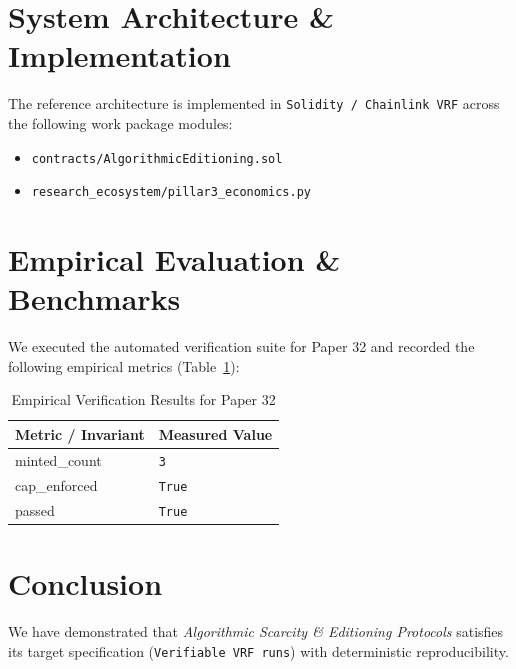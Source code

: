 \documentclass[10pt,twocolumn]{article}
\begin{document}
\section{System Architecture \& Implementation}
The reference architecture is implemented in \texttt{Solidity / Chainlink VRF} across the following work package modules:
\begin{itemize}
  \item \texttt{contracts/AlgorithmicEditioning.sol}
  \item \texttt{research\_ecosystem/pillar3\_economics.py}
\end{itemize}

\section{Empirical Evaluation \& Benchmarks}
We executed the automated verification suite for Paper 32 and recorded the following empirical metrics (Table~\ref{tab:metrics}):

\begin{table}[htbp]
\centering
\caption{Empirical Verification Results for Paper 32}
\label{tab:metrics}
\begin{tabular}{ll}
\toprule
\textbf{Metric / Invariant} & \textbf{Measured Value} \\
\midrule
    minted\_count & \texttt{3} \\
    cap\_enforced & \texttt{True} \\
    passed & \texttt{True} \\
\bottomrule
\end{tabular}
\end{table}

\section{Conclusion}
We have demonstrated that \textit{Algorithmic Scarcity \& Editioning Protocols} satisfies its target specification (\texttt{Verifiable VRF runs}) with deterministic reproducibility.



\end{document}
